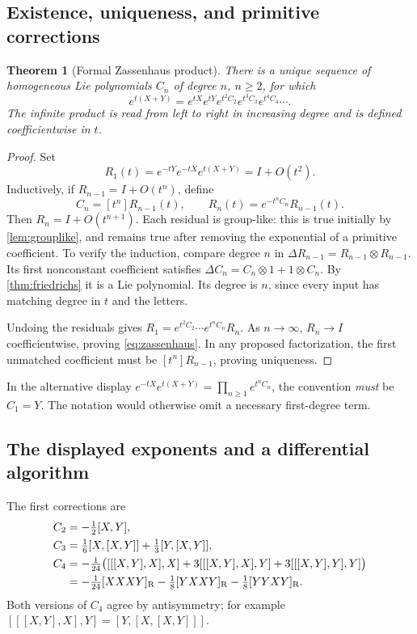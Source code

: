 \documentclass[11pt]{article}
\numberwithin{equation}{section}
\newtheorem{theorem}{Theorem}[section]
\theoremstyle{definition}
\theoremstyle{remark}
\newcommand{\RB}[1]{[#1]_{\mathrm R}}
\begin{document}
\subsection{Existence, uniqueness, and primitive corrections}
\begin{theorem}[Formal Zassenhaus product]\label{thm:zassenhaus}
There is a unique sequence of homogeneous Lie polynomials $C_n$ of
degree $n$, $n\geq2$, for which
\begin{equation}\label{eq:zassenhaus}
 e^{t(X+Y)}=e^{tX}e^{tY}
             e^{t^2C_2}e^{t^3C_3}e^{t^4C_4}\cdots.
\end{equation}
The infinite product is read from left to right in increasing degree
and is defined coefficientwise in $t$.
\end{theorem}
\begin{proof}
Set
\begin{equation}\label{eq:residualstart}
 R_1(t)=e^{-tY}e^{-tX}e^{t(X+Y)}=I+O(t^2).
\end{equation}
Inductively, if $R_{n-1}=I+O(t^n)$, define
\begin{equation}\label{eq:residualalgorithm}
 C_n=[t^n]R_{n-1}(t),\qquad
 R_n(t)=e^{-t^nC_n}R_{n-1}(t).
\end{equation}
Then $R_n=I+O(t^{n+1})$. Each residual is group-like: this is true
initially by \cref{lem:grouplike}, and remains true after removing
the exponential of a primitive coefficient. To verify the induction,
compare degree $n$ in
$\Delta R_{n-1}=R_{n-1}\otimes R_{n-1}$. Its first nonconstant
coefficient satisfies
$\Delta C_n=C_n\otimes1+1\otimes C_n$. By
\cref{thm:friedrichs} it is a Lie polynomial. Its degree is $n$,
since every input has matching degree in $t$ and the letters.

Undoing the residuals gives
$R_1=e^{t^2C_2}\cdots e^{t^nC_n}R_n$.
As $n\to\infty$, $R_n\to I$ coefficientwise, proving
\eqref{eq:zassenhaus}. In any proposed factorization, the first
unmatched coefficient must be $[t^n]R_{n-1}$, proving uniqueness.
\end{proof}
In the alternative display
$e^{-tX}e^{t(X+Y)}=\prod_{n\geq1}e^{t^nC_n}$, the convention
\emph{must} be $C_1=Y$. The notation would otherwise omit a
necessary first-degree term.

\subsection{The displayed exponents and a differential algorithm}
The first corrections are
\begin{align}
 C_2&=-\tfrac12[X,Y],\label{eq:c2}\\
 C_3&=\tfrac16[X,[X,Y]]+\tfrac13[Y,[X,Y]],\label{eq:c3}\\
 C_4&=-\tfrac1{24}\bigl([[[X,Y],X],X]
           +3[[[X,Y],X],Y]+3[[[X,Y],Y],Y]\bigr)\notag\\
     &=-\tfrac1{24}\RB{XXXY}
       -\tfrac18\RB{YXXY}-\tfrac18\RB{YYXY}.
       \label{eq:c4}
\end{align}
Both versions of $C_4$ agree by antisymmetry; for example
$[[[X,Y],X],Y]=[Y,[X,[X,Y]]]$.
\end{document}

